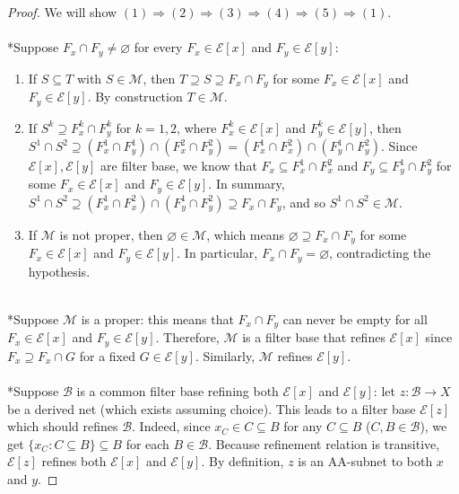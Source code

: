 \documentclass{treatise}
\begin{document}
\begin{proof}
We will show $(1) \Rightarrow (2) \Rightarrow (3) \Rightarrow (4) \Rightarrow (5) \Rightarrow (1)$.
\\
\\
*Suppose $F_x \cap F_y \neq \varnothing$ for every $F_x \in \mathcal{E}[x]$ and $F_y \in \mathcal{E}[y]$:
\begin{enumerate}
    \item If $S \subseteq T$ with $S \in \mathcal{M}$, then $T \supseteq S \supseteq F_x \cap F_y$ for some $F_x \in \mathcal{E}[x]$ and $F_y \in \mathcal{E}[y]$. By construction $T \in \mathcal{M}$.
    \item If $S^k \supseteq F^k_x \cap F^k_y$ for $k = 1, 2$, where $F^k_x \in \mathcal{E}[x]$ and $F^k_y \in \mathcal{E}[y]$, then $S^1 \cap S^2 \supseteq (F^1_x \cap F^1_y) \cap (F^2_x \cap F^2_y) = (F^1_x \cap F^2_x) \cap (F^1_y \cap F^2_y)$. Since $\mathcal{E}[x], \mathcal{E}[y]$ are filter base, we know that $F_x \subseteq F^1_x \cap F^2_x$ and $F_y \subseteq F^1_y \cap F^2_y$ for some $F_x \in \mathcal{E}[x]$ and $F_y \in \mathcal{E}[y]$. In summary, $S^1 \cap S^2 \supseteq (F^1_x \cap F^2_x) \cap (F^1_y \cap F^2_y) \supseteq F_x \cap F_y$, and so $S^1 \cap S^2 \in \mathcal{M}$.
    \item If $\mathcal{M}$ is not proper, then $\varnothing \in \mathcal{M}$, which means $\varnothing \supseteq F_x \cap F_y$ for some $F_x \in \mathcal{E}[x]$ and $F_y \in \mathcal{E}[y]$. In particular, $F_x \cap F_y = \varnothing$, contradicting the hypothesis.
\end{enumerate}
\ \\
*Suppose $\mathcal{M}$ is a proper: this means that $F_x \cap F_y$ can never be empty for all $F_x \in \mathcal{E}[x]$ and $F_y \in \mathcal{E}[y]$. Therefore, $\mathcal{M}$ is a filter base that refines $\mathcal{E}[x]$ since $F_x \supseteq F_x \cap G$ for a fixed $G \in \mathcal{E}[y]$. Similarly, $\mathcal{M}$ refines $\mathcal{E}[y]$.
\\
\\
*Suppose $\mathcal{B}$ is a common filter base refining both $\mathcal{E}[x]$ and $\mathcal{E}[y]$: let $z: \mathcal{B} \to X$ be a derived net (which exists assuming choice). This leads to a filter base $\mathcal{E}[z]$ which should refines $\mathcal{B}$. Indeed, since $x_C \in C \subseteq B$ for any $C \subseteq B$ ($C, B \in \mathcal{B}$), we get $\{ x_C : C \subseteq B \} \subseteq B$ for each $B \in \mathcal{B}$. Because refinement relation is transitive, $\mathcal{E}[z]$ refines both $\mathcal{E}[x]$ and $\mathcal{E}[y]$. By definition, $z$ is an AA-subnet to both $x$ and $y$.

\end{proof}
\end{document}
